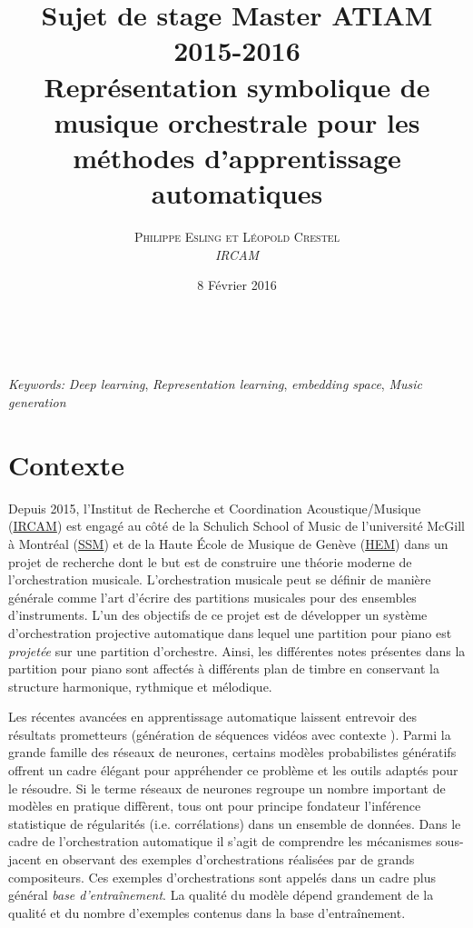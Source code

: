 \documentclass[a4paper, 10pt]{article} %
\title{Sujet de stage Master ATIAM 2015-2016\\ %
\textbf{Représentation symbolique de musique orchestrale pour les méthodes d'apprentissage automatiques}} %
\author{\textsc{Philippe Esling et Léopold Crestel} %
\\{\textit{IRCAM}}} %
\date{8 Février 2016} %
\makeatletter
\renewcommand{\maketitle}{ %
\begin{flushright} %
{\LARGE\@title} %

\vspace{50pt} %

{\large\@author} %
\\\@date %

\vspace{40pt} %
\end{flushright}
}
\makeatother
\begin{document}
\maketitle %


\hspace*{3,6mm}\textit{Keywords:} \textit{Deep learning}, \textit{Representation learning}, \textit{embedding space}, \textit{Music generation}

\vspace{30pt} %


\section*{Contexte}

Depuis 2015, l'Institut de Recherche et Coordination Acoustique/Musique (\href{http://www.ircam.fr/}{IRCAM}) est engagé au côté de la Schulich School of Music de l'université McGill à Montréal (\href{http://www.mcgill.ca/music/}{SSM}) et de la Haute École de Musique de Genève	(\href{http://www.hesge.ch/hem/}{HEM}) dans un projet de recherche dont le but est de construire une théorie moderne de l'orchestration musicale. L'orchestration musicale peut se définir de manière générale comme l'art d'écrire des partitions musicales pour des ensembles d'instruments. L'un des objectifs de ce projet est de développer un système d'orchestration projective automatique dans lequel une partition pour piano est \textit{projetée} sur une partition d'orchestre. 
Ainsi, les différentes notes présentes dans la partition pour piano sont affectés à différents plan de timbre \cite{mcadams2013timbre} en conservant la structure harmonique, rythmique et mélodique.

Les récentes avancées en apprentissage automatique laissent entrevoir des résultats prometteurs (génération de séquences vidéos avec contexte \cite{taylor2009factored}). Parmi la grande famille des réseaux de neurones, certains modèles probabilistes génératifs offrent un cadre élégant pour appréhender ce problème et les outils adaptés pour le résoudre. Si le terme réseaux de neurones regroupe un nombre important de modèles en pratique diffèrent, tous ont pour principe fondateur l'inférence statistique de régularités (i.e. corrélations) dans un ensemble de données. Dans le cadre de l'orchestration automatique il s'agit de comprendre les mécanismes sous-jacent en observant des exemples d'orchestrations réalisées par de grands compositeurs. Ces exemples d'orchestrations sont appelés dans un cadre plus général \textit{base d'entraînement}. La qualité du modèle dépend grandement de la qualité et du nombre d'exemples contenus dans la base d'entraînement.
\end{document}
